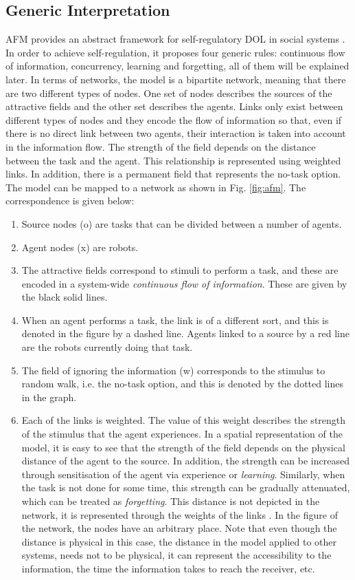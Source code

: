 \documentclass{llncs}
\begin{document}
\subsection{Generic Interpretation}
AFM provides an abstract framework for self-regulatory DOL in social systems \cite{Elsa}. In order to achieve self-regulation, it proposes four generic rules: continuous flow of information, concurrency, learning and forgetting, all of them will be explained later. In terms of networks, the model is a bipartite network, meaning that there are two different types of nodes. One set of nodes describes the sources of the attractive fields and the other set describes the agents. Links only exist between different types of nodes and they encode the flow of information so that, even if there is no direct link between two agents, their interaction is taken into account in the information flow. The strength of the field depends on the distance between the task and the agent.  This relationship is represented using weighted links. In addition, there is a permanent field that represents the no-task option. The model can be mapped to a network as shown in Fig. \ref{fig:afm}. The correspondence is given below:
\begin{enumerate}
\item Source nodes (o) are tasks that can be divided between a number of agents.
\item Agent nodes (x) are robots.
\item The attractive fields correspond to stimuli to perform a task, and these are encoded in a system-wide {\em continuous flow of information}. These are given by the black solid lines.
\item When an agent performs a task, the link is of a different sort, and this is denoted in the figure by a dashed line. Agents linked to a source by a red line are the robots currently doing that task. 
\item The field of ignoring the information (w) corresponds to the stimulus to random walk, i.e. the no-task option, and this is denoted by the dotted lines in the graph. 
\item Each of the links is weighted. The value of this weight describes the strength of the stimulus that the agent experiences. In a spatial representation of the model, it is easy to see that the strength of the field depends on the physical distance of the agent to the source. In addition, the strength can be increased through sensitisation of the agent via experience or {\em learning}. Similarly, when the task is not done for some time, this strength can be gradually attenuated, which can be treated as {\em forgetting}.  This distance is not depicted in the network, it is represented through the weights of the links . In the figure of the network, the nodes have an arbitrary place. Note that even though the distance is physical in this case, the distance in the model applied to other systems, needs not to be physical, it can represent the accessibility to the information, the time the information takes to reach the receiver, etc. 
\end{enumerate}
\end{document}
